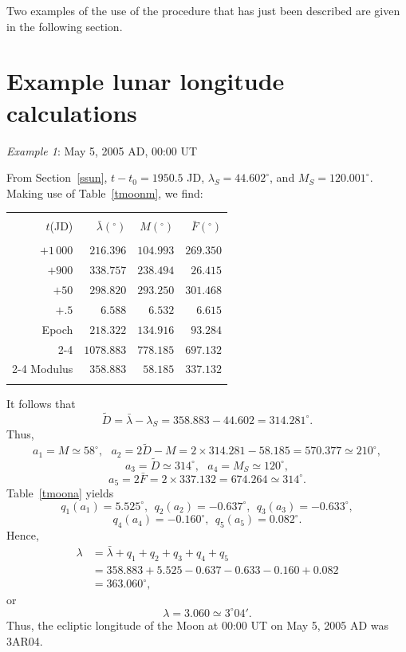 Two examples of the use of the procedure that has just been described are given in the following section.

\section{Example lunar longitude calculations}\label{exllat}
\begin{center}
 {\em Example 1}: May 5, 2005 AD, 00:00 UT
 \end{center}
From Section~\ref{ssun}, $t-t_0=1950.5$ JD, $\lambda_S = 44.602^\circ$, and $M_S= 120.001^\circ$. 
Making use of Table~\ref{tmoonm}, we find:
\begin{center}
\begin{tabular}{rrrr}
&&&\\
$t$(JD) & $ \bar{\lambda}(^\circ)$ & $M(^\circ)$ & $\bar{F}(^\circ)$\\[-2ex]
&&&\\
$+1\,000$ & $216.396$ & $104.993$ & $269.350$\\
$+900$ & $338.757$ & $238.494$ & $26.415$\\
$+50$ & $298.820$ & $293.250$ & $301.468$\\
$+.5$ & $6.588$ & $6.532$ & $6.615$\\
Epoch & $218.322$ & $134.916$ & $93.284$\\\cline{2-4}
&$1078.883$ & $778.185$ & $697.132$\\\cline{2-4}
Modulus & $358.883$ & $58.185$ &$337.132$\\ 
&&&\\
\end{tabular}
\end{center}
It follows that 
$$
\tilde{D}=\bar{\lambda}-\lambda_S = 358.883-44.602 = 314.281^\circ.
$$
Thus, 
$$
a_1=M\simeq 58^\circ,~~~a_2=2\tilde{D}-M = 2\times 314.281-58.185=570.377\simeq 210^\circ,
$$ 
$$
a_3=\tilde{D}\simeq 314^\circ,~~~a_4 = M_S\simeq 120^\circ,
$$ 
$$
a_5=2\bar{F} = 2\times 337.132=674.264\simeq 314^\circ.
$$
Table~\ref{tmoona} yields $$
q_1(a_1)=5.525^\circ,~~q_2(a_2)= -0.637^\circ,~~q_3(a_3) = -0.633^\circ,
$$
$$q_4(a_4)=-0.160^\circ,~~q_5(a_5)= 0.082^\circ.
$$
 Hence,
\begin{align*}
\lambda &= \bar{\lambda} + q_1+q_2+q_3+q_4+q_5\\[0.5ex]
&=358.883+5.525-0.637-0.633-0.160+0.082\\[0.5ex]
&=
363.060^\circ,
\end{align*}
or 
$$
\lambda =3.060\simeq 3^\circ 04'.
$$
Thus, the ecliptic longitude of the Moon at 00:00 UT on May 5, 2005 AD was 3AR04.

